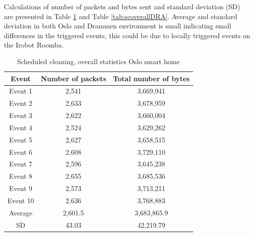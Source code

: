 Calculations of number of packets and bytes sent and standard deviation (SD) are presented in Table \ref{tab:scoverall} and Table \ref{tab:scoverallDRA}. Average and standard deviation in both Oslo and Drammen environment is small indicating small differences in the triggered events, this could be due to locally triggered events on the Irobot Roomba. 

\begin{table}[H]
\centering
\caption{Scheduled cleaning, overall statistics Oslo smart home}
\label{tab:scoverall}
\begin{tabular}{|c|c|c|}
\hline
\textbf{Event} & \textbf{Number of packets} & \textbf{Total number of bytes} \\ \hline
Event 1        & 2,541                   & 3,669,941                   \\ \hline
Event 2        & 2,633                   & 3,678,959                   \\ \hline
Event 3        & 2,622                   & 3,660,004                   \\ \hline
Event 4        & 2,524                   & 3,629,262                   \\ \hline
Event 5        & 2,627                   & 3,658,515                   \\ \hline
Event 6        & 2,608                   & 3,729,110                   \\ \hline
Event 7        & 2,596                   & 3,645,238                   \\ \hline
Event 8        & 2,655                   & 3,685,536                   \\ \hline
Event 9        & 2,573                   & 3,713,211                   \\ \hline
Event 10       & 2,636                   & 3,768,883                   \\ \hline
Average        & 2,601.5                 & 3,683,865.9                 \\ \hline
SD       & 43.03       & 42,219.79               \\ \hline
\end{tabular}
\end{table}

